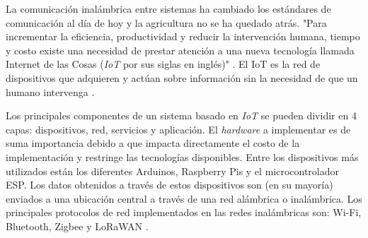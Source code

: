 
La comunicación inalámbrica entre sistemas ha cambiado los estándares de comunicación al día de hoy y la agricultura no se ha quedado atrás. "Para incrementar la eficiencia, productividad y reducir la intervención humana, tiempo y costo existe una necesidad de prestar atención a una nueva tecnología llamada Internet de las Cosas (\textit{IoT} por sus siglas en inglés)" \cite{agriculture_automation_review}. El IoT es la red de dispositivos que adquieren y actúan sobre información sin la necesidad de que un humano intervenga \cite{agriculture_automation_review}. 

Los principales componentes de un sistema basado en \textit{IoT} se pueden dividir en 4 capas: dispositivos, red, servicios y aplicación. El \textit{hardware} a implementar es de suma importancia debido a que impacta directamente el costo de la implementación y restringe las tecnologías disponibles. Entre los dispositivos más utilizados están los diferentes Arduinos, Raspberry Pis y el microcontrolador ESP. Los datos obtenidos a través de estos dispositivos son (en su mayoría) enviados a una ubicación central a través de una red alámbrica o inalámbrica. Los principales protocolos de red implementados en las redes inalámbricas son: Wi-Fi, Bluetooth, Zigbee y LoRaWAN \cite{systematicreviewiot}. 
